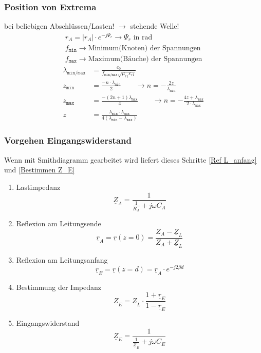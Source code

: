 \subsubsection{Position von Extrema}
bei beliebigen Abschlüssen/Lasten! $ \rightarrow $ stehende Welle!
\begin{gather*}
	\boxed{r_A = |r_A|\cdot e^{-j\Psi_r}}\rightarrow\Psi_r\text{ in rad}\\
	f_\texttt{min}\rightarrow \text{Minimum(Knoten) der Spannungen}\\
	f_\texttt{max}\rightarrow \text{Maximum(Bäuche) der Spannungen}
\end{gather*}
\begin{align*}
	\lambda_\texttt{min/max} & = \frac{c_0}{f_\texttt{min/max}\sqrt{\mu_{r1}\varepsilon_{r1}}}                                                                                                 \\
	z_\texttt{min}           & =\frac{-n\cdot\lambda_\texttt{min}}{2}                                        \qquad\rightarrow n = -\frac{2z}{\lambda_\texttt{min}}                            \\
	z_\texttt{max}           & =\frac{-(2n+1)\lambda_\texttt{max}}{4}                                        \qquad\rightarrow n = -\frac{4z+\lambda_\texttt{max}}{2\cdot\lambda_\texttt{max}} \\
	z                        & = \frac{\lambda_\texttt{min}\cdot\lambda_\texttt{max}}{4(\lambda_\texttt{min}-\lambda_\texttt{max})}
\end{align*}

\subsubsection{Vorgehen Eingangswiderstand}
Wenn mit Smithdiagramm gearbeitet wird liefert dieses Schritte \ref{Ref L_anfang} und \ref{Bestimmen Z_E}
\begin{enumerate}
    \item Lastimpedanz
          \[ \underline{Z}_A = \dfrac{1}{\frac{1}{R_A} + j \omega C_A} \]
    \item Reflexion am Leitungsende
          \[ \underline{r}_A = \underline{r}(z=0) = \dfrac{Z_A - \underline{Z}_L}{Z_A + \underline{Z}_L} \]
    \item Reflexion am Leitungsanfang \label{Ref L_anfang}
          \[ \underline{r}_E = \underline{r}(z=d) =  \underline{r}_A \cdot e^{-j 2 \beta d}\]
    \item Bestimmung der Impedanz \label{Bestimmen Z_E}
          \[ \underline{Z}_E = \underline{Z}_L \cdot \dfrac{1 + \underline{r}_E}{1 - \underline{r}_E}\]
    \item Eingangswiderstand
          \[ \underline{Z}_E = \dfrac{1}{\frac{1}{\underline{Z}_E} + j \omega C_E}\]
\end{enumerate}

